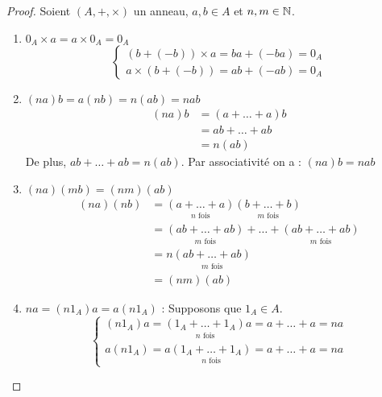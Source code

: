 \begin{footnotesize}
    \begin{proof} 
        Soient $(A,+,\times)$ un anneau, $a,b \in A$ et $n,m \in \mathbb{N}$. 
        \begin{enumerate}[label=\roman*)]
            \item ${0_A \times a = a \times 0_A = 0_A}$ 
                \[
                    \begin{cases}
                        (b + (-b)) \times a = ba + (-ba) = 0_A \\ 
                        a \times (b + (-b)) = ab + (-ab) = 0_A
                    \end{cases}
                \]
            \item ${(na)b = a(nb) = n(ab) = nab}$
                    \begin{align*}
                        (na)b &= (a + \dots + a) b \\ 
                                &= ab +\dots + ab \\ 
                                &= n(ab)
                    \end{align*}
                    De plus, $ab + \dots + ab = n(ab)$. Par associativité on a : $(na)b = nab$  
            \item ${(na)(mb) = (nm)(ab)}$
                    \begin{align*}
                        (na)(nb) &= \underset{n\text{ fois}}{(a + \dots + a)} \underset{m\text{ fois}}{(b + \dots + b)} \\ 
                                    &= \underset{m\text{ fois}}{(ab + \dots + ab)} + \dots + \underset{m\text{ fois}}{(ab + \dots + ab)} \\ 
                                    &= n \underset{m \text{ fois}}{(ab + \dots + ab)} \\ 
                                    &= (nm)(ab)
                    \end{align*}
            \item $na = (n1_A)a = a(n1_A)$ : Supposons que $1_A \in A$. 
                    \[
                        \begin{cases}
                            (n1_A)a = \underset{n\text{ fois}}{(1_A + \dots + 1_A)} a = a + \dots + a = na \\ 
                            a(n1_A) = a \underset{n\text{ fois}}{(1_A + \dots + 1_A)} = a + \dots + a = na
                        \end{cases}
                    \]
        \end{enumerate}
    \end{proof}
\end{footnotesize}

